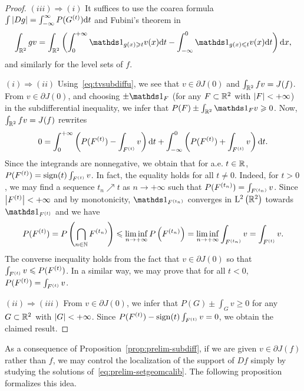 \begin{proof}
  $(iii) \Rightarrow (i)$ It suffices to use the coarea formula $\int \left| Dg \right| = \int_{-\infty}^{\infty} P(G^{(t)})\mathrm{d} t$ and Fubini's theorem in \begin{equation}
    \int_{\RR^2} gv = \int_{\RR^2}\left( \int_0^{+\infty}\bun{g(x)\geq t}v(x)\d t -  \int_{-\infty}^0\bun{g(x)\leq t}v(x)\d t \right)\d x,
  \end{equation}
and similarly for the level sets of $f$.

$(i) \Rightarrow (ii)$ Using~\eqref{eq:tvsubdiffu}, we see that $v\in \partial J(0)$ and $\int_{\mathbb{R}^2}fv=J(f)$. 
From $v\in \partial J(0)$, and choosing $\pm\bun{F}$ (for any $F\subset \mathbb{R}^2$ with $\left| F \right|<+\infty$) in the subdifferential inequality, we infer that  $P(F)\pm\int_{\RR^2}\bun{F}v \geq 0$. Now, $\int_{\mathbb{R}^2}fv=J(f)$ rewrites
\begin{align*}
  0 =\int_0^{+\infty}\left( P(F^{(t)})-\int_{F^{(t)}}v\right)\mathrm{d} t + \int_{-\infty}^0\left(P(F^{(t)})+\int_{F^{(t)}}v \right)\mathrm{d} t.
\end{align*}
Since the integrands are nonnegative, we obtain that for a.e. $t\in \mathbb{R}$, $P(F^{(t)})=\operatorname{sign}(t)\int_{F^{(t)}}v$. In fact, the equality holds for all $t\neq 0$. Indeed, for $t>0$, we may find a sequence $t_n\nearrow t$ as $n\to +\infty$ such that $ P(F^{(t_n)})=\int_{F^{(t_n)}}v$. Since $\left| F^{(t)} \right|<+\infty$ and by monotonicity, $\bun{\F{t_n}}$ converges in $\mathrm{L}^2\left(\mathbb{R}^2\right)$ towards $\bun{\F{t}}$ and we have
\begin{equation*}
  P(F^{(t)})=P\left(\bigcap_{n\in\mathbb{N}} F^{(t_n)}\right)\leqslant \liminf_{n\to +\infty} P\left(F^{(t_n)}\right)= \liminf_{n\to +\infty} \int_{F^{(t_n)}}v = \int_{F^{(t)}} v.
\end{equation*}
The converse inequality holds from the fact that $v\in \partial J(0)$ so that $\int_{F^{(t)}} v\leqslant   P(F^{(t)})$.
In a similar way, we may prove that for all $t<0$, $P(F^{(t)})= \int_{F^{(t)}} v$.

$(ii)\Rightarrow (iii)$ From $v\in \partial J(0)$, we infer that $P(G) \pm \int_{G} v\geq 0$ for any $G\subset \mathbb{R}^2$ with $\left| G \right|<+\infty$. Since $P(F^{(t)})-\operatorname{sign}(t)\int_{F^{(t)}}v=0$, we obtain the claimed result.
\end{proof}

As a consequence of Proposition~\ref{prop:prelim-subdiff}, if we are given $v\in \partial J(f)$ rather than $f$, we may control the localization of the support of $Df$ simply by studying the solutions of~\eqref{eq:prelim-setgeomcalib}. The following proposition formalizes this idea.

